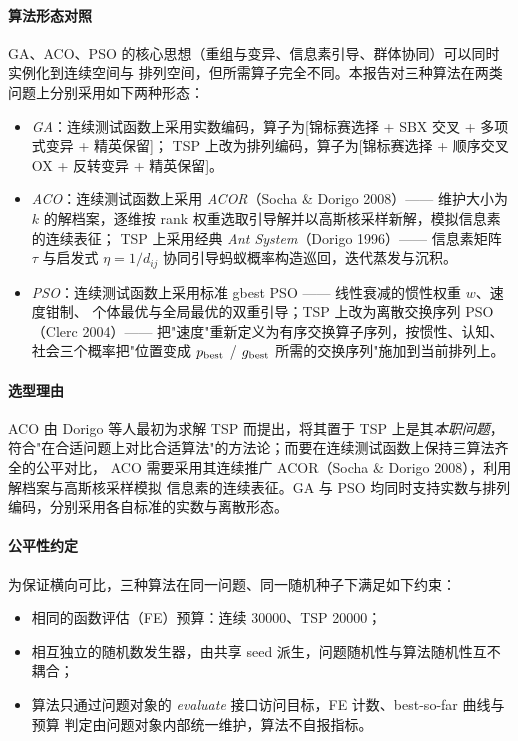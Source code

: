 \documentclass[12pt,a4paper,fontset=windows]{ctexart}
\begin{document}
\paragraph{算法形态对照}
GA、ACO、PSO 的核心思想（重组与变异、信息素引导、群体协同）可以同时实例化到连续空间与
排列空间，但所需算子完全不同。本报告对三种算法在两类问题上分别采用如下两种形态：

\begin{itemize}
  \item \emph{GA}：连续测试函数上采用实数编码，算子为[锦标赛选择 + SBX 交叉 + 多项式变异 + 精英保留]；
        TSP 上改为排列编码，算子为[锦标赛选择 + 顺序交叉 OX + 反转变异 + 精英保留]。
  \item \emph{ACO}：连续测试函数上采用 \emph{ACOR}（Socha \& Dorigo 2008）—— 维护大小为 $k$
        的解档案，逐维按 rank 权重选取引导解并以高斯核采样新解，模拟信息素的连续表征；
        TSP 上采用经典 \emph{Ant System}（Dorigo 1996）—— 信息素矩阵 $\tau$ 与启发式 $\eta=1/d_{ij}$
        协同引导蚂蚁概率构造巡回，迭代蒸发与沉积。
  \item \emph{PSO}：连续测试函数上采用标准 gbest PSO —— 线性衰减的惯性权重 $w$、速度钳制、
        个体最优与全局最优的双重引导；TSP 上改为离散交换序列 PSO（Clerc 2004）——
        把"速度"重新定义为有序交换算子序列，按惯性、认知、社会三个概率把"位置变成
        $p_{\rm best}$ / $g_{\rm best}$ 所需的交换序列"施加到当前排列上。
\end{itemize}

\paragraph{选型理由}
ACO 由 Dorigo 等人最初为求解 TSP 而提出，将其置于 TSP 上是其\emph{本职问题}，
符合"在合适问题上对比合适算法"的方法论；而要在连续测试函数上保持三算法齐全的公平对比，
ACO 需要采用其连续推广 ACOR（Socha \& Dorigo 2008），利用解档案与高斯核采样模拟
信息素的连续表征。GA 与 PSO 均同时支持实数与排列编码，分别采用各自标准的实数与离散形态。

\paragraph{公平性约定}
为保证横向可比，三种算法在同一问题、同一随机种子下满足如下约束：

\begin{itemize}
  \item 相同的函数评估（FE）预算：连续 30000、TSP 20000；
  \item 相互独立的随机数发生器，由共享 seed 派生，问题随机性与算法随机性互不耦合；
  \item 算法只通过问题对象的 \emph{evaluate} 接口访问目标，FE 计数、best-so-far 曲线与预算
        判定由问题对象内部统一维护，算法不自报指标。
\end{itemize}
\end{document}
